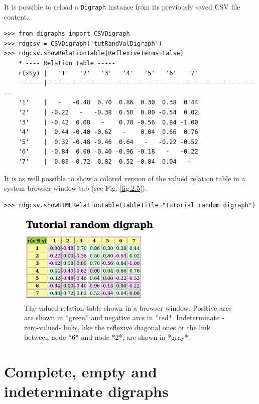 It is possible to reload a \texttt{Digraph} instance from its previously saved CSV file content.
\begin{lstlisting} 
>>> from digraphs import CSVDigraph   
>>> rdgcsv = CSVDigraph('tutRandValDigraph')
>>> rdgcsv.showRelationTable(ReflexiveTerms=False)
    * ---- Relation Table -----
    r(xSy) |   '1'   '2'   '3'   '4'   '5'   '6'   '7'	  
    -------|------------------------------------------------------------
    '1'    |   -   -0.48  0.70  0.86  0.30  0.38  0.44	 
    '2'    | -0.22   -   -0.38  0.50  0.80 -0.54  0.02	 
    '3'    | -0.42  0.08   -    0.70 -0.56  0.84 -1.00	 
    '4'    |  0.44 -0.40 -0.62   -    0.04  0.66  0.76	 
    '5'    |  0.32 -0.48 -0.46  0.64   -   -0.22 -0.52	 
    '6'    | -0.84  0.00 -0.40 -0.96 -0.18   -   -0.22	 
    '7'    |  0.88  0.72  0.82  0.52 -0.84  0.04   -
\end{lstlisting}
  
It is as well possible to show a colored version of the valued relation table in a system browser window tab (see Fig. \ref{fig:2.5}).
\begin{lstlisting}
>>> rdgcsv.showHTMLRelationTable(tableTitle="Tutorial random digraph")
\end{lstlisting}
 \begin{figure}[h]
\sidecaption
\includegraphics[width=7cm]{Figures/htmlTutorialDigraph.png}
\caption{The valued relation table shown in a browser window. Positive arcs are shown in *green* and negative arcs in *red*. Indeterminate -zero-valued- links, like the reflexive diagonal ones or the link between node *6* and node *2*, are shown in *gray*.}
\label{fig:2.6}       %
\end{figure}
 
\section{Complete, empty and indeterminate digraphs}
\label{sec:2.10}

